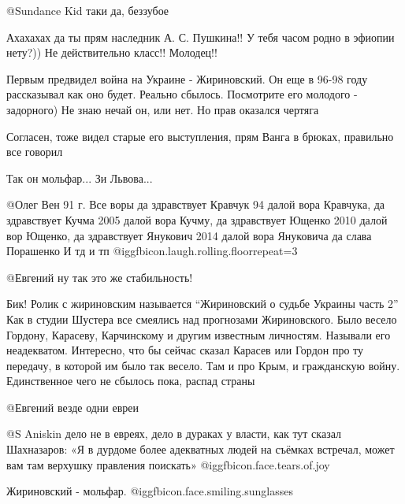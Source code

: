 \begin{itemize}
\begin{itemize}
 @Sundance Kid  таки да, беззубое

Ахахахах да ты прям наследник А. С. Пушкина!! У тебя часом родно в эфиопии нету?)) Не действительно класс!! Молодец!!
\end{itemize} %


Первым предвидел война на Украине - Жириновский. Он еще в 96-98 году
рассказывал как оно будет. Реально сбылось. Посмотрите его молодого -
задорного) Не знаю нечай он, или нет. Но прав оказался чертяга

\begin{itemize} %

Согласен, тоже видел старые его выступления, прям Ванга в брюках, правильно все говорил

Так он мольфар... Зи Львова...


\obeycr
@Олег Вен  91 г. Все воры да здравствует Кравчук
94 далой вора Кравчука, да здравствует Кучма
2005 далой вора Кучму, да здравствует Ющенко 
2010 далой вор Ющенко, да здравствует Янукович 
2014 далой вора Януковича да слава Порашенко 
И тд и тп @igg{fbicon.laugh.rolling.floor}{repeat=3} 
\restorecr


@Евгений  ну так это же стабильность!


Бик! Ролик с жириновским называется \enquote{Жириновский о судьбе Украины часть
2} Как в студии Шустера все смеялись над прогнозами Жириновского. Было весело
Гордону, Карасеву, Карчинскому и другим известным личностям. Называли его
неадекватом. Интересно, что бы сейчас сказал Карасев или Гордон про ту
передачу, в которой им было так весело. Там и про Крым, и гражданскую войну.
Единственное чего не сбылось пока, распад страны


@Евгений  везде одни евреи


@S Aniskin  дело не в евреях, дело в дураках у власти, как тут сказал
Шахназаров: «Я в дурдоме более адекватных людей на съёмках встречал, может вам
там верхушку правления поискать»  @igg{fbicon.face.tears.of.joy} 

Жириновский - мольфар. @igg{fbicon.face.smiling.sunglasses} 



\end{itemize}
\end{itemize}
